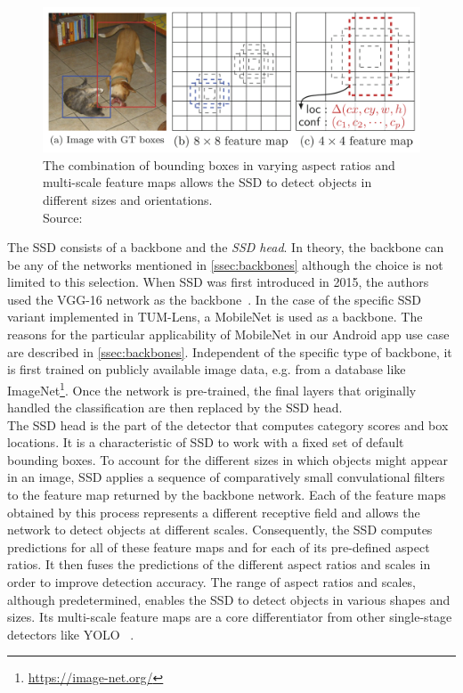 \documentclass[
			   fontsize=11pt,
               paper=a4,
               bibliography=totoc,
               idxtotoc,
               headsepline,
               footsepline,
               footinclude=false,
               BCOR=12mm,
               DIV=13,
               openany,   %
               ]
               {scrbook}
\begin{document}
\begin{figure}[H] %
	\centering
	\includegraphics[width=\textwidth]{figures/ssd_feature_maps_scaling.png}
	\caption[Detecting Objects at Different Scales through SSD's Feature Maps]{The combination of bounding boxes in varying aspect ratios and multi-scale feature maps allows the SSD to detect objects in different sizes and orientations.\\
		\tiny{Source:~\cite{detectorSSD}}}
	\label{fig:ssdFeatureMapScaling} %
\end{figure}

\noindent The SSD consists of a backbone and the \textit{SSD head}. In theory, the backbone can be any of the networks mentioned in \autoref{ssec:backbones} although the choice is not limited to this selection. When SSD was first introduced  in 2015, the authors used the VGG-16 network as the backbone~\cite{detectorSSD}. In the case of the specific SSD variant implemented in TUM-Lens, a MobileNet is used as a backbone. The reasons for the particular applicability of MobileNet in our Android app use case are described in \autoref{ssec:backbones}. Independent of the specific type of backbone, it is first trained on publicly available image data, e.g. from a database like ImageNet\footnote{\url{https://image-net.org/}}. Once the network is pre-trained, the final layers that originally handled the classification are then replaced by the SSD head. \\

The SSD head is the part of the detector that computes category scores and box locations. It is a characteristic of SSD to work with a fixed set of default bounding boxes. To account for the different sizes in which objects might appear in an image, SSD applies a sequence of comparatively small convulational filters to the feature map returned by the backbone network. Each of the feature maps obtained by this process represents a different receptive field and allows the network to detect objects at different scales. Consequently, the SSD computes predictions for all of these feature maps and for each of its pre-defined aspect ratios. It then fuses the predictions of the different aspect ratios and scales in order to improve detection accuracy. The range of aspect ratios and scales, although predetermined, enables the SSD to detect objects in various shapes and sizes. Its multi-scale feature maps are a core differentiator from other single-stage detectors like YOLO~\cite{detectorSSD, detectorYOLOv1} .
\end{document}
